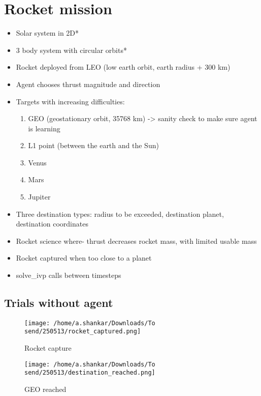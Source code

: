 \documentclass{article}
\begin{document}
\section{Rocket mission}
\begin{itemize}
    \item Solar system in 2D*
    \item 3 body system with circular orbits*
    \item Rocket deployed from LEO (low earth orbit, earth radius + 300 km)
    \item Agent chooses thrust magnitude and direction
    \item Targets with increasing difficulties:\\
    \begin{enumerate}
        \item GEO (geostationary orbit, 35768 km) -> sanity check to make sure agent is learning
        \item L1 point (between the earth and the Sun)
        \item Venus
        \item Mars
        \item Jupiter
    \end{enumerate}
    \item Three destination types: radius to be exceeded, destination planet, destination coordinates
    \item Rocket science where- thrust decreases rocket mass, with limited usable mass
    \item Rocket captured when too close to a planet
    \item solve\_ivp calls between timesteps
\end{itemize}
\subsection{Trials without agent}
\begin{figure}[h!]
    \centering
    \texttt{[image: /home/a.shankar/Downloads/To send/250513/rocket\_captured.png]}
    \caption{Rocket capture}
\end{figure}
\begin{figure}[h!]
    \centering
    \texttt{[image: /home/a.shankar/Downloads/To send/250513/destination\_reached.png]}
    \caption{GEO reached}
\end{figure}
\end{document}
